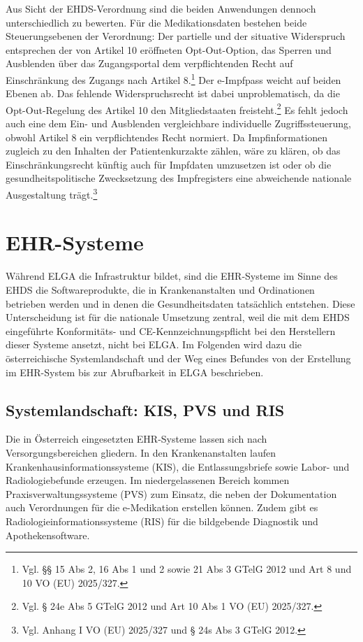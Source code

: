 Aus Sicht der EHDS-Verordnung sind die beiden Anwendungen dennoch unterschiedlich zu bewerten. Für die Medikationsdaten bestehen beide Steuerungsebenen der Verordnung: Der partielle und der situative Widerspruch entsprechen der von Artikel 10 eröffneten Opt-Out-Option, das Sperren und Ausblenden über das Zugangsportal dem verpflichtenden Recht auf Einschränkung des Zugangs nach Artikel 8.\footnote{Vgl. §§ 15 Abs 2, 16 Abs 1 und 2 sowie 21 Abs 3 GTelG 2012 und Art 8 und 10 VO (EU) 2025/327.} Der e-Impfpass weicht auf beiden Ebenen ab. Das fehlende Widerspruchsrecht ist dabei unproblematisch, da die Opt-Out-Regelung des Artikel 10 den Mitgliedstaaten freisteht.\footnote{Vgl. § 24e Abs 5 GTelG 2012 und Art 10 Abs 1 VO (EU) 2025/327.} Es fehlt jedoch auch eine dem Ein- und Ausblenden vergleichbare individuelle Zugriffssteuerung, obwohl Artikel 8 ein verpflichtendes Recht normiert. Da Impfinformationen zugleich zu den Inhalten der Patientenkurzakte zählen, wäre zu klären, ob das Einschränkungsrecht künftig auch für Impfdaten umzusetzen ist oder ob die gesundheitspolitische Zwecksetzung des Impfregisters eine abweichende nationale Ausgestaltung trägt.\footnote{Vgl. Anhang I VO (EU) 2025/327 und § 24s Abs 3 GTelG 2012.}

\section{EHR-Systeme}
Während ELGA die Infrastruktur bildet, sind die EHR-Systeme im Sinne des EHDS die Softwareprodukte, die in Krankenanstalten und Ordinationen betrieben werden und in denen die Gesundheitsdaten tatsächlich entstehen. Diese Unterscheidung ist für die nationale Umsetzung zentral, weil die mit dem EHDS eingeführte Konformitäts- und CE-Kennzeichnungspflicht bei den Herstellern dieser Systeme ansetzt, nicht bei ELGA. Im Folgenden wird dazu die österreichische Systemlandschaft und der Weg eines Befundes von der Erstellung im EHR-System bis zur Abrufbarkeit in ELGA beschrieben.

    \subsection{Systemlandschaft: KIS, PVS und RIS}
Die in Österreich eingesetzten EHR-Systeme lassen sich nach Versorgungsbereichen gliedern. In den Krankenanstalten laufen Krankenhausinformationssysteme (KIS), die Entlassungsbriefe sowie Labor- und Radiologiebefunde erzeugen. Im niedergelassenen Bereich kommen Praxisverwaltungssysteme (PVS) zum Einsatz, die neben der Dokumentation auch Verordnungen für die e-Medikation erstellen können. Zudem gibt es Radiologieinformationssysteme (RIS) für die bildgebende Diagnostik und Apothekensoftware.

